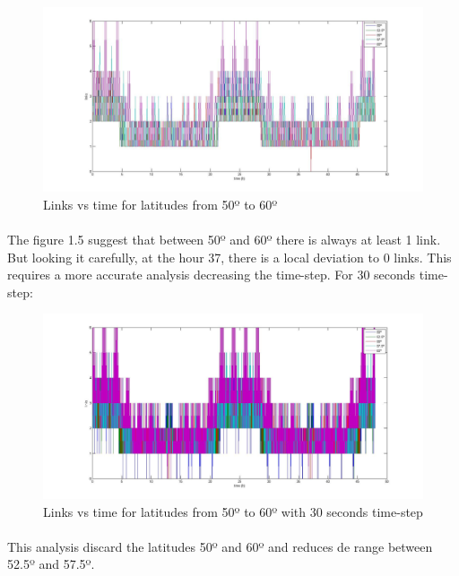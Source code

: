 \documentclass[12pt,a4paper]{report}
\begin{document}
\begin{figure}[H]
\begin{center}
\includegraphics[scale=0.30]{50_2,5_60_lat.jpg}
\caption{Links vs time for latitudes from 50º to 60º}
\end{center}
\end{figure}

\paragraph{}
The figure 1.5 suggest that between 50º and 60º there is always at least 1 link. But looking it carefully, at the hour 37, there is a local deviation to 0 links. This requires a more accurate analysis decreasing the time-step. For 30 seconds time-step:

\begin{figure}[H]
\begin{center}
\includegraphics[scale=0.30]{50_2,5_60_(30s)_lat.jpg}
\caption{Links vs time for latitudes from 50º to 60º with 30 seconds time-step}
\end{center}
\end{figure}

\paragraph{}
This analysis discard the latitudes 50º and 60º and reduces de range between 52.5º and 57.5º. 
\end{document}
